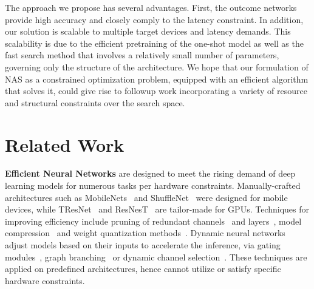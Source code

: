 \documentclass[dvipsnames,table,xcdraw]{article}
\begin{document}
 The approach we propose has several advantages. First, the outcome networks provide high accuracy and closely comply to the latency constraint. 
 In addition, our solution is scalable to multiple target devices and latency demands. This scalability is due to the efficient pretraining of the one-shot model as well as the fast search method that involves a relatively small number of parameters, governing only the structure of the architecture. 
 We hope that our formulation of NAS as a constrained optimization problem, equipped with an efficient algorithm that solves it, could give rise to followup work incorporating a variety of resource and structural constraints over the search space.  \section{Related Work}
\textbf{Efficient Neural Networks} are designed to meet the rising demand of deep learning models for numerous tasks per hardware constraints. Manually-crafted architectures such as MobileNets~\cite{howard2017mobilenets,sandler2018mobilenetv2} and ShuffleNet~\cite{zhang2018shufflenet} were designed for mobile devices, while TResNet~\cite{ridnik2020tresnet} and ResNesT~\cite{zhang2020resnest} are tailor-made for GPUs. Techniques for improving efficiency include pruning of redundant channels~\cite{dong2019network,aflalo2020knapsack} and layers~\cite{han2015learning}, model compression~\cite{han2015deep, he2018amc} and weight quantization methods~\cite{hubara2016binarized,umuroglu2017finn}. Dynamic neural networks adjust models based on their inputs to accelerate the inference, via gating modules~\cite{wang2018skipnet}, graph branching~\cite{huang2017multi} or dynamic channel selection~\cite{lin2017runtime}. These techniques are applied on  predefined architectures, hence cannot utilize or satisfy specific hardware constraints. 
\end{document}
